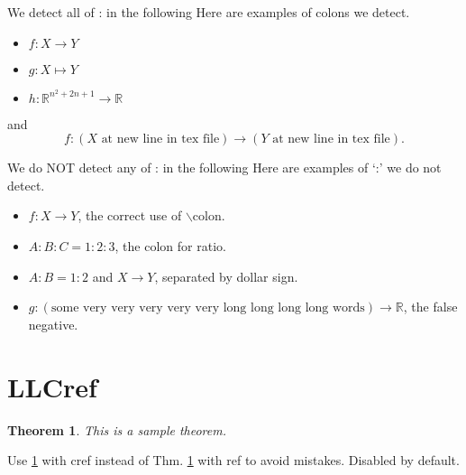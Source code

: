 \documentclass[a4paper]{article}
\newtheorem{theorem}{Theorem}
\begin{document}
\begin{itembox}{We detect all of : in the following}
	Here are examples of colons we detect.
	\begin{itemize}
		\item $f:X \to Y$
		\item \( g: X \mapsto Y \)
		\item $h : \mathbb{R}^{n^2 + 2n + 1} \rightarrow \mathbb{R}$
	\end{itemize}
	and
	\begin{equation} \label{eq:sample}
		f:
		(X \text{ at new line in tex file})
		\to
		(Y \text{ at new line in tex file}).
	\end{equation}
\end{itembox}

\vspace{\baselineskip}

\begin{itembox}{We do NOT detect any of : in the following}
	Here are examples of `:' we do not detect.
	\begin{itemize}
		\item $f\colon X \to Y$, the correct use of $\backslash$colon.
		\item $A:B:C = 1:2:3$, the colon for ratio.
		\item $A:B = 1:2$ and $X \to Y$, separated by dollar sign.
		\item $g: (\text{some very very very very very long long long long words}) \to \mathbb{R}$, the false negative.
	\end{itemize}
\end{itembox}


\section{LLCref}

\begin{theorem}\label{thm:sample}
	This is a sample theorem.
\end{theorem}

Use \cref{thm:sample} with cref instead of Thm. \ref{thm:sample} with ref to avoid mistakes.
Disabled by default.
\end{document}
